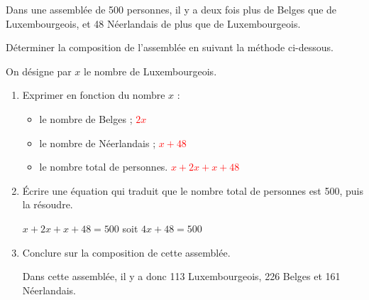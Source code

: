 \begin{corrige}
    Dans une assemblée de 500 personnes, il y a deux fois plus de Belges que de Luxembourgeois, 
    et 48 Néerlandais de plus que de Luxembourgeois. 
    
    Déterminer la composition de l'assemblée en suivant la méthode ci-dessous. 
    
    On désigne par $x$ le nombre de Luxembourgeois.

    \begin{enumerate}
        \item Exprimer en fonction du nombre $x$ :
        \begin{itemize}
            \item le nombre de Belges ; \textcolor{red}{$2x$}
            \item le nombre de Néerlandais ; \textcolor{red}{$x+48$}
            \item le nombre total de personnes. \textcolor{red}{$x+2x+x+48$}
        \end{itemize}
        \item Écrire une équation qui traduit que le nombre total de personnes est 500, puis la résoudre.
        
        {\color{red} $x+2x+x+48=500$ soit $4x+48=500$        
        \vspace*{-4mm}
        }
        \vspace*{-10mm}
        \item Conclure sur la composition de cette assemblée.
        
        {\color{red} Dans cette assemblée, il y a donc 113 Luxembourgeois, 226 Belges et 161 Néerlandais.}
    \end{enumerate}
    \vspace*{-10mm}
\end{corrige}

